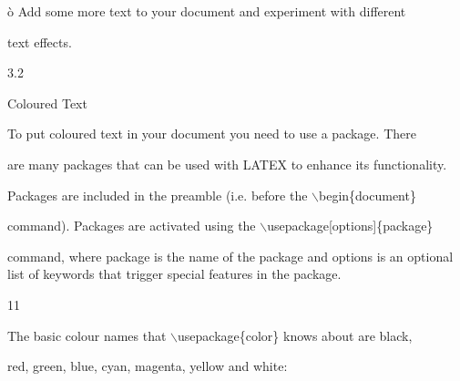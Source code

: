 \documentclass[a4paper,portrait,12pt]{article}
\begin{document}
\begin{flushleft}
\`{o} Add some more text to your document and experiment with different
\end{flushleft}


\begin{flushleft}
text effects.
\end{flushleft}





3.2





\begin{flushleft}
Coloured Text
\end{flushleft}





\begin{flushleft}
To put coloured text in your document you need to use a package. There
\end{flushleft}


\begin{flushleft}
are many packages that can be used with LATEX to enhance its functionality.
\end{flushleft}


\begin{flushleft}
Packages are included in the preamble (i.e. before the \ensuremath{\backslash}begin\{document\}
\end{flushleft}


\begin{flushleft}
command). Packages are activated using the \ensuremath{\backslash}usepackage[options]\{package\}
\end{flushleft}


\begin{flushleft}
command, where package is the name of the package and options is an optional list of keywords that trigger special features in the package.
\end{flushleft}


11





\begin{flushleft}
\newpage
The basic colour names that \ensuremath{\backslash}usepackage\{color\} knows about are black,
\end{flushleft}


\begin{flushleft}
red, green, blue, cyan, magenta, yellow and white:
\end{flushleft}
\end{document}
